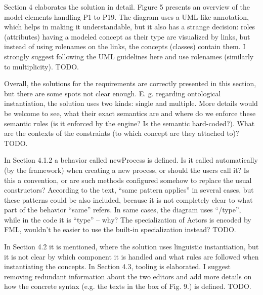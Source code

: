 \documentclass[10pt]{article}
\begin{document}
\begin{response}{Section 4 elaborates the solution in detail. Figure 5 presents an overview of the model elements handling P1 to P19. The diagram uses a UML-like annotation, which helps in making it understandable, but it also has a strange decision: roles (attributes) having a modeled concept as their type are visualized by links, but instead of using rolenames on the links, the concepts (classes) contain them. I strongly suggest following the UML guidelines here and use rolenames (similarly to multiplicity).}
TODO.
\end{response}

\begin{response}{Overall, the solutions for the requirements are correctly presented in this section, but there are some spots not clear enough. E. g. regarding ontological instantiation, the solution uses two kinds: single and multiple. More details would be welcome to see, what their exact semantics are and where do we enforce these semantic rules (is it enforced by the engine? Is the semantic hard-coded?). What are the contexts of the constraints (to which concept are they attached to)?} 
TODO.
\end{response}


\begin{response}{In Section 4.1.2 a behavior called newProcess is defined. Is it called automatically (by the framework) when creating a new process, or should the users call it? Is this a convention, or are such methods configured somehow to replace the usual constructors? According to the text, “same pattern applies” in several cases, but these patterns could be also included, because it is not completely clear to what part of the behavior “same” refers. In same cases, the diagram uses “/type”, while in the code it is “type” – why? The specialization of Actors is encoded by FML, wouldn’t be easier to use the built-in specialization instead?} 
TODO.
\end{response}


\begin{response}{In Section 4.2 it is mentioned, where the solution uses linguistic instantiation, but it is not clear by which component it is handled and what rules are followed when instantiating the concepts. In Section 4.3, tooling is elaborated. I suggest removing redundant information about the two editors and add more details on how the concrete syntax (e.g. the texts in the box of Fig. 9.) is defined.} 
TODO.
\end{response}
\end{document}
